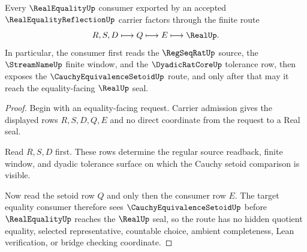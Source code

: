 \begin{theorem}
\label{thm:real-equality-reflection-cauchy-setoid-route}
Every $\RealEqualityUp$ consumer exported by an accepted $\RealEqualityReflectionUp$ carrier factors through the finite route
$$
R,S,D\longmapsto Q\longmapsto E\longmapsto \RealUp .
$$
In particular, the consumer first reads the $\RegSeqRatUp$ source, the $\StreamNameUp$ finite window, and the $\DyadicRatCoreUp$ tolerance row, then exposes the $\CauchyEquivalenceSetoidUp$ route, and only after that may it reach the equality-facing $\RealUp$ seal.
\end{theorem}
\begin{proof}
Begin with an equality-facing request. Carrier admission gives the displayed rows $R,S,D,Q,E$ and no direct coordinate from the request to a Real seal.

Read $R,S,D$ first. These rows determine the regular source readback, finite window, and dyadic tolerance surface on which the Cauchy setoid comparison is visible.

Now read the setoid row $Q$ and only then the consumer row $E$. The target equality consumer therefore sees $\CauchyEquivalenceSetoidUp$ before $\RealEqualityUp$ reaches the $\RealUp$ seal, so the route has no hidden quotient equality, selected representative, countable choice, ambient completeness, Lean verification, or bridge checking coordinate.
\end{proof}



